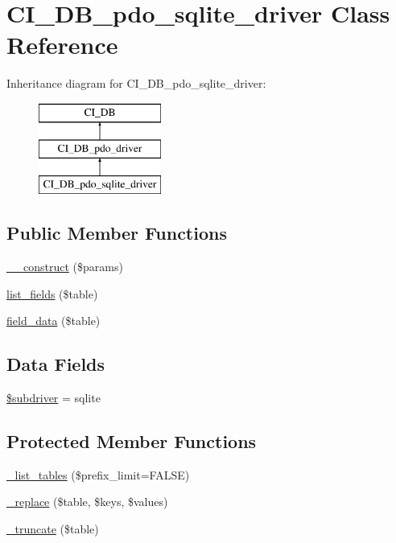 \hypertarget{class_c_i___d_b__pdo__sqlite__driver}{}\section{C\+I\+\_\+\+D\+B\+\_\+pdo\+\_\+sqlite\+\_\+driver Class Reference}
\label{class_c_i___d_b__pdo__sqlite__driver}
Inheritance diagram for C\+I\+\_\+\+D\+B\+\_\+pdo\+\_\+sqlite\+\_\+driver\+:\begin{figure}[H]
\begin{center}
\leavevmode
\includegraphics[height=3.000000cm]{class_c_i___d_b__pdo__sqlite__driver}
\end{center}
\end{figure}
\subsection*{Public Member Functions}
\begin{DoxyCompactItemize}
\item 
\mbox{\hyperlink{class_c_i___d_b__pdo__sqlite__driver_a9162320adff1a1a4afd7f2372f753a3e}{\+\_\+\+\_\+construct}} (\$params)
\item 
\mbox{\hyperlink{class_c_i___d_b__pdo__sqlite__driver_aef08cd376b16b24608100ca0e3f2f85b}{list\+\_\+fields}} (\$table)
\item 
\mbox{\hyperlink{class_c_i___d_b__pdo__sqlite__driver_a90355121e1ed009e0efdbd544ab56efa}{field\+\_\+data}} (\$table)
\end{DoxyCompactItemize}
\subsection*{Data Fields}
\begin{DoxyCompactItemize}
\item 
\mbox{\hyperlink{class_c_i___d_b__pdo__sqlite__driver_a1322ca756348b11d080cb7a4f590de15}{\$subdriver}} = \textquotesingle{}sqlite\textquotesingle{}
\end{DoxyCompactItemize}
\subsection*{Protected Member Functions}
\begin{DoxyCompactItemize}
\item 
\mbox{\hyperlink{class_c_i___d_b__pdo__sqlite__driver_a435c0f3ce54fe7daa178baa8532ebd54}{\+\_\+list\+\_\+tables}} (\$prefix\+\_\+limit=F\+A\+L\+SE)
\item 
\mbox{\hyperlink{class_c_i___d_b__pdo__sqlite__driver_ae0adf73984daf2d42ad29b66c484c82b}{\+\_\+replace}} (\$table, \$keys, \$values)
\item 
\mbox{\hyperlink{class_c_i___d_b__pdo__sqlite__driver_aa029600528fc1ce660a23ff4b4667f95}{\+\_\+truncate}} (\$table)
\end{DoxyCompactItemize}
